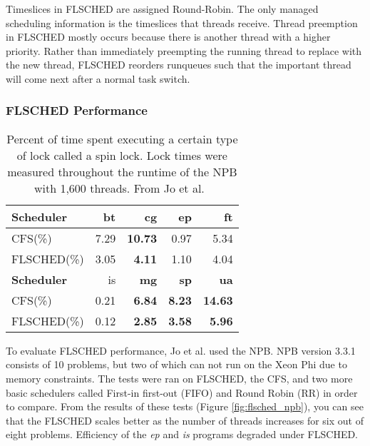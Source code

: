 \documentclass{sig-alternate}
\begin{document}
Timeslices in FLSCHED are assigned Round-Robin. The only managed scheduling information is the timeslices that threads receive. Thread preemption in FLSCHED mostly occurs because there is another thread with a higher priority. Rather than immediately preempting the running thread to replace with the new thread, FLSCHED reorders runqueues such that the important thread will come next after a normal task switch.~\cite{Jo:2017}


\subsubsection{FLSCHED Performance}
\label{sec:flsched_performance}


\begin{table}
	\begin{center}
	\begin{tabular}{ l | r | r | r | r }
		\textbf{Scheduler} & bt & \textbf{cg} & ep & ft \\ \hline
		CFS(\%) & 7.29 & \textbf{10.73} & 0.97 & 5.34 \\
		FLSCHED(\%) & 3.05 & \textbf{4.11} & 1.10 & 4.04
		\vspace{0.2cm}
		 \\ %
		\textbf{Scheduler} & is & \textbf{mg} & \textbf{sp} & \textbf{ua} \\ \hline
		CFS(\%) & 0.21 & \textbf{6.84} & \textbf{8.23} & \textbf{14.63} \\
		FLSCHED(\%) & 0.12 & \textbf{2.85} & \textbf{3.58} & \textbf{5.96} \\ %
	\end{tabular}
\end{center}
	\caption{ Percent of time spent executing a certain type of lock called a spin lock. Lock times were measured throughout the runtime of the NPB with 1,600 threads. From Jo et al.~\cite{Jo:2017}}
	\label{fig:flsched_spinlock}
\end{table}



 To evaluate FLSCHED performance, Jo et al. used the NPB. NPB version 3.3.1 consists of 10 problems, but two of which can not run on the Xeon Phi due to memory constraints. The tests were ran on FLSCHED, the CFS, and two more basic schedulers called First-in first-out (FIFO) and Round Robin (RR) in order to compare. From the results of these tests (Figure \ref{fig:flsched_npb}), you can see that the FLSCHED scales better as the number of threads increases for six out of eight problems. Efficiency of the \textit{ep} and \textit{is} programs degraded under FLSCHED.~\cite{Jo:2017}
\end{document}
